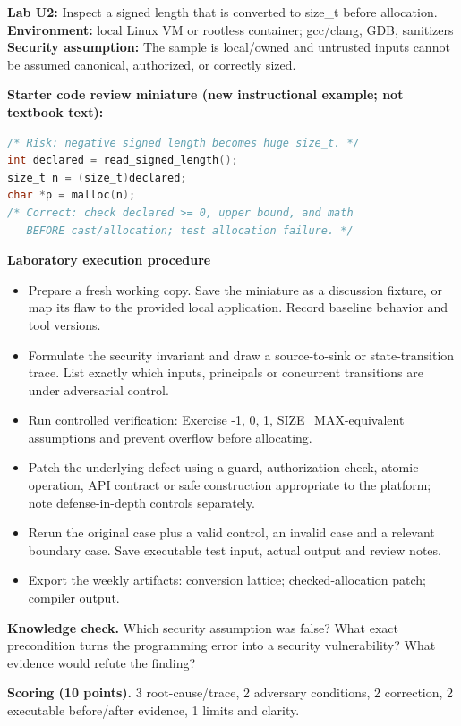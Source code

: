 \documentclass[10pt,letterpaper]{article}
\begin{document}
\begin{insight}\textbf{Lab U2:} Inspect a signed length that is converted to size\_t before allocation.\\\textbf{Environment:} local Linux VM or rootless container; gcc/clang, GDB, sanitizers\\\textbf{Security assumption:} The sample is local/owned and untrusted inputs cannot be assumed canonical, authorized, or correctly sized.\end{insight}
\textbf{Starter code review miniature (new instructional example; not textbook text):}
\begin{lstlisting}[language=C]
/* Risk: negative signed length becomes huge size_t. */
int declared = read_signed_length();
size_t n = (size_t)declared;
char *p = malloc(n);
/* Correct: check declared >= 0, upper bound, and math
   BEFORE cast/allocation; test allocation failure. */
\end{lstlisting}
\textbf{Laboratory execution procedure}
\begin{itemize}[leftmargin=*,itemsep=2pt]
\item Prepare a fresh working copy. Save the miniature as a discussion fixture, or map its flaw to the provided local application. Record baseline behavior and tool versions.
\item Formulate the security invariant and draw a source-to-sink or state-transition trace. List exactly which inputs, principals or concurrent transitions are under adversarial control.
\item Run controlled verification: Exercise -1, 0, 1, SIZE\_MAX-equivalent assumptions and prevent overflow before allocating.
\item Patch the underlying defect using a guard, authorization check, atomic operation, API contract or safe construction appropriate to the platform; note defense-in-depth controls separately.
\item Rerun the original case plus a valid control, an invalid case and a relevant boundary case. Save executable test input, actual output and review notes.
\item Export the weekly artifacts: conversion lattice; checked-allocation patch; compiler output.
\end{itemize}
\textbf{Knowledge check.} Which security assumption was false? What exact precondition turns the programming error into a security vulnerability? What evidence would refute the finding?

\textbf{Scoring (10 points).} 3 root-cause/trace, 2 adversary conditions, 2 correction, 2 executable before/after evidence, 1 limits and clarity.
\end{document}
